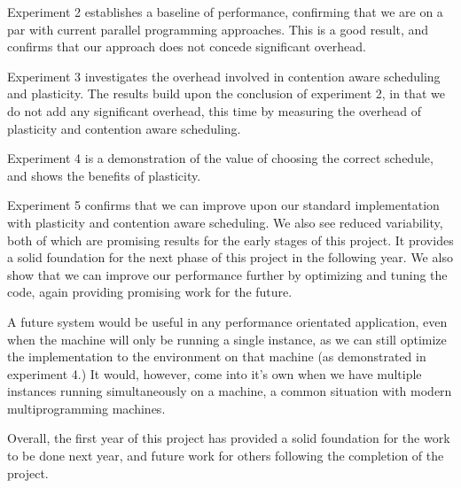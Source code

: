 Experiment 2 establishes a baseline of performance, confirming that we are on a par with current parallel programming approaches. This is a good result, and confirms that our approach does not concede significant overhead. 

Experiment 3 investigates the overhead involved in contention aware scheduling and plasticity. The results build upon the conclusion of experiment 2, in that we do not add any significant overhead, this time by measuring the overhead of plasticity and contention aware scheduling.

Experiment 4 is a demonstration of the value of choosing the correct schedule, and shows the benefits of plasticity. 

Experiment 5 confirms that we can improve upon our standard implementation with plasticity and contention aware scheduling. We also see reduced variability, both of which are promising results for the early stages of this project. It provides a solid foundation for the next phase of this project in the following year. We also show that we can improve our performance further by optimizing and tuning the code, again providing promising work for the future.

A future system would be useful in any performance orientated application, even when the machine will only be running a single instance, as we can still optimize the implementation to the environment on that machine (as demonstrated in experiment 4.) It would, however, come into it's own when we have multiple instances running simultaneously on a machine, a common situation with modern multiprogramming machines.

Overall, the first year of this project has provided a solid foundation for the work to be done next year, and future work for others following the completion of the project.